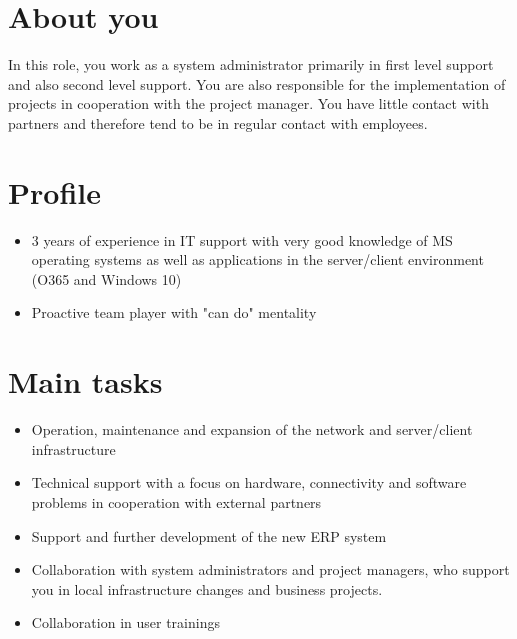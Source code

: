 \section*{About you}
In this role, you work as a system administrator primarily in first level support and also second level support. You are also responsible for the implementation of projects in cooperation with the project manager. You have little contact with partners and therefore tend to be in regular contact with employees.

\section*{Profile}
\begin{itemize}

    \item 3 years of experience in IT support with very good knowledge of MS operating systems as well as applications in the server/client environment (O365 and Windows 10)
    \item Proactive team player with "can do" mentality
\end{itemize}

\section*{Main tasks}
\begin{itemize}
    \item Operation, maintenance and expansion of the network and server/client infrastructure
    \item Technical support with a focus on hardware, connectivity and software problems in cooperation with external partners
    \item Support and further development of the new ERP system
    \item Collaboration with system administrators and project managers, who support you in local infrastructure changes and business projects.
    \item Collaboration in user trainings
\end{itemize}
